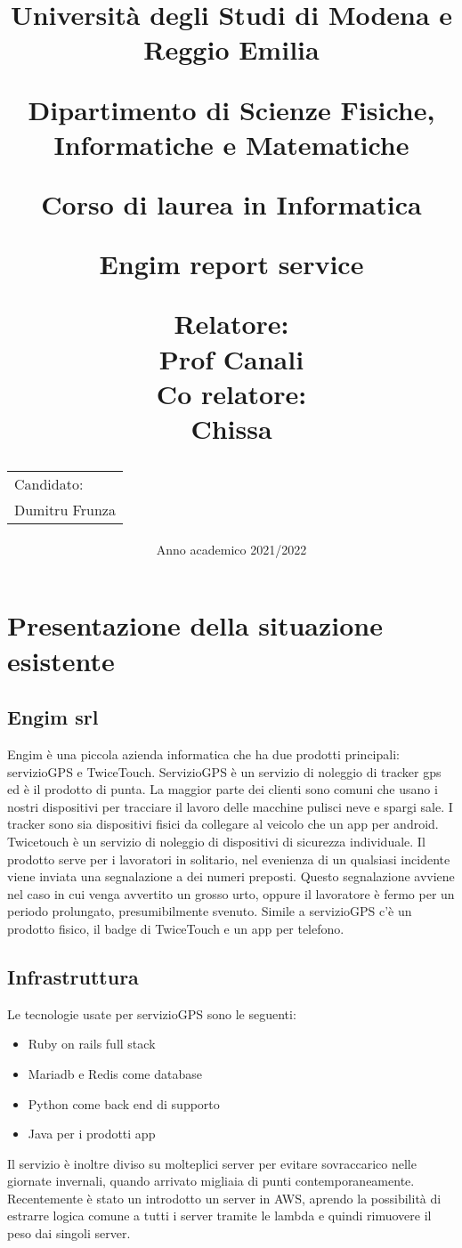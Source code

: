 \documentclass[12pt]{article}
\author{}
\title{
    \huge 
        \textbf{Università degli Studi di Modena e Reggio Emilia}
    \large
        \par Dipartimento di Scienze Fisiche, Informatiche e Matematiche
        \par Corso di laurea in Informatica
    \vfil
        \huge \par \textbf{Engim report service}
    \vfil
    \normalsize
    \begin{flushleft}
      Relatore: \\ 
      Prof Canali \\
      Co relatore: \\
      Chissa
    \end{flushleft}
    \begin{flushright}
      \begin{tabular}{@{}l@{}}
      Candidato: \\
      Dumitru Frunza
      \end{tabular}
    \end{flushright}
}
\date{Anno academico 2021/2022}
\begin{document}
\maketitle
\section{Presentazione della situazione esistente}
\subsection{Engim srl}
Engim è una piccola azienda informatica che ha due prodotti principali: servizioGPS e TwiceTouch.
ServizioGPS è un servizio di noleggio di tracker gps ed è il prodotto di punta.
La maggior parte dei clienti sono comuni che usano i nostri dispositivi per tracciare il
lavoro delle macchine pulisci neve e spargi sale.
I tracker sono sia dispositivi fisici da collegare al veicolo che un app per
android.
\newline Twicetouch è un servizio di noleggio di dispositivi di sicurezza individuale.
Il prodotto serve per i lavoratori in solitario, nel evenienza di un qualsiasi
incidente viene inviata una segnalazione a dei numeri preposti. Questo segnalazione
avviene nel caso in cui venga avvertito un grosso urto, oppure il lavoratore è
fermo per un periodo prolungato, presumibilmente svenuto. Simile a servizioGPS c'è
un prodotto fisico, il badge di TwiceTouch e un app per telefono.

\subsection{Infrastruttura}
Le tecnologie usate per servizioGPS sono le seguenti:
\begin{itemize}
  \item Ruby on rails full stack
  \item Mariadb e Redis come database
  \item Python come back end di supporto
  \item Java per i prodotti app
\end{itemize}
Il servizio è inoltre diviso su molteplici server per evitare sovraccarico nelle
giornate invernali, quando arrivato migliaia di punti contemporaneamente.
Recentemente è stato un introdotto un server in AWS, aprendo la possibilità di
estrarre logica comune a tutti i server tramite le lambda e quindi rimuovere il
peso dai singoli server.
\end{document}
